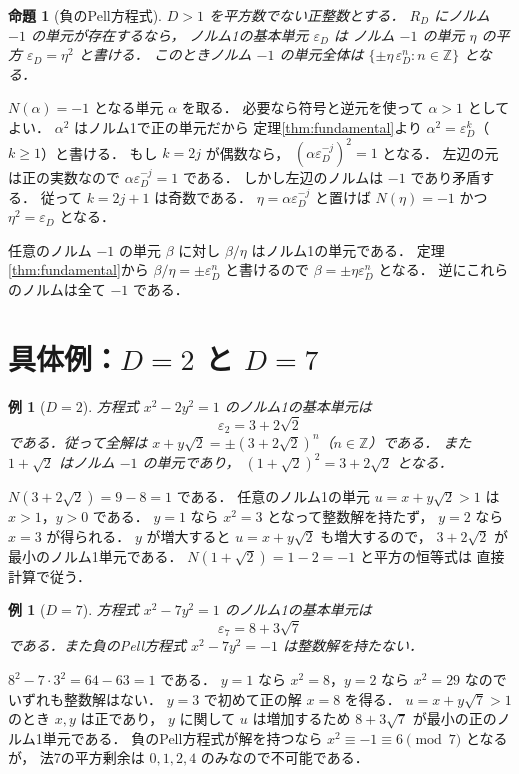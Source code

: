\documentclass[a5paper,10pt,onecolumn]{jsarticle}
\makeatletter
\theoremstyle{mathnotetheorem}
\newtheorem{proposition}[theorem]{命題}
\newtheorem{example}[theorem]{例}
\renewcommand{\proofname}{証明}
\renewenvironment{proof}[1][\proofname]{%
  \par\pushQED{\qed}\normalfont\topsep4\p@\@plus2\p@\relax
  \trivlist\item[\hskip\labelsep\bfseries #1]\ignorespaces
}{\popQED\endtrivlist\@endpefalse}
\makeatother
\begin{document}
\begin{proposition}[負のPell方程式]\label{prop:negative}
$D>1$ を平方数でない正整数とする．
$R_D$ にノルム $-1$ の単元が存在するなら，
ノルム1の基本単元 $\varepsilon_D$ は
ノルム $-1$ の単元 $\eta$ の平方
$\varepsilon_D=\eta^2$ と書ける．
このときノルム $-1$ の単元全体は
$\{\pm\eta\,\varepsilon_D^n:n\in\mathbb Z\}$ となる．
\end{proposition}
\begin{proof}
$N(\alpha)=-1$ となる単元 $\alpha$ を取る．
必要なら符号と逆元を使って
$\alpha>1$ としてよい．
$\alpha^2$ はノルム1で正の単元だから
定理\ref{thm:fundamental}より
$\alpha^2=\varepsilon_D^k$（$k\ge1$）と書ける．
もし $k=2j$ が偶数なら，
$(\alpha\varepsilon_D^{-j})^2=1$ となる．
左辺の元は正の実数なので
$\alpha\varepsilon_D^{-j}=1$ である．
しかし左辺のノルムは $-1$ であり矛盾する．
従って $k=2j+1$ は奇数である．
$\eta=\alpha\varepsilon_D^{-j}$ と置けば
$N(\eta)=-1$ かつ $\eta^2=\varepsilon_D$ となる．

任意のノルム $-1$ の単元 $\beta$ に対し
$\beta/\eta$ はノルム1の単元である．
定理\ref{thm:fundamental}から
$\beta/\eta=\pm\varepsilon_D^n$ と書けるので
$\beta=\pm\eta\varepsilon_D^n$ となる．
逆にこれらのノルムは全て $-1$ である．
\end{proof}

\section{具体例：$D=2$ と $D=7$}

\begin{example}[$D=2$]
方程式 $x^2-2y^2=1$ のノルム1の基本単元は
\[
 \varepsilon_2=3+2\sqrt2
\]
である．従って全解は
$x+y\sqrt2=\pm(3+2\sqrt2)^n$（$n\in\mathbb Z$）である．
また $1+\sqrt2$ はノルム $-1$ の単元であり，
$(1+\sqrt2)^2=3+2\sqrt2$ となる．
\end{example}
\begin{proof}
$N(3+2\sqrt2)=9-8=1$ である．
任意のノルム1の単元 $u=x+y\sqrt2>1$ は
$x>1$，$y>0$ である．
$y=1$ なら $x^2=3$ となって整数解を持たず，
$y=2$ なら $x=3$ が得られる．
$y$ が増大すると
$u=x+y\sqrt2$ も増大するので，
$3+2\sqrt2$ が最小のノルム1単元である．
$N(1+\sqrt2)=1-2=-1$ と平方の恒等式は
直接計算で従う．
\end{proof}

\begin{example}[$D=7$]
方程式 $x^2-7y^2=1$ のノルム1の基本単元は
\[
 \varepsilon_7=8+3\sqrt7
\]
である．また負のPell方程式
$x^2-7y^2=-1$ は整数解を持たない．
\end{example}
\begin{proof}
$8^2-7\cdot3^2=64-63=1$ である．
$y=1$ なら $x^2=8$，$y=2$ なら $x^2=29$ なので
いずれも整数解はない．
$y=3$ で初めて正の解 $x=8$ を得る．
$u=x+y\sqrt7>1$ のとき $x,y$ は正であり，
$y$ に関して $u$ は増加するため
$8+3\sqrt7$ が最小の正のノルム1単元である．
負のPell方程式が解を持つなら
$x^2\equiv-1\equiv6\pmod7$ となるが，
法7の平方剰余は $0,1,2,4$ のみなので不可能である．
\end{proof}
\end{document}
